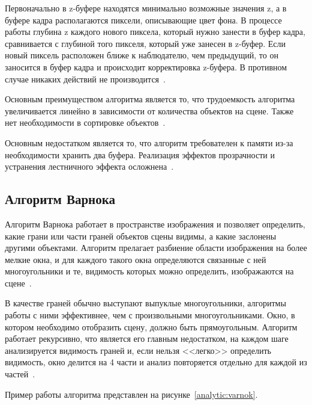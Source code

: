 \documentclass[a4paper, 14pt]{extreport}
\begin{document}
Первоначально в z-буфере находятся минимально возможные значения z, а в буфере кадра располагаются пиксели, 
описывающие цвет фона. В процессе работы глубина z каждого нового пиксела, который нужно занести в буфер кадра, 
сравнивается с глубиной того пикселя, который уже занесен в z-буфер. Если новый пиксель расположен ближе к наблюдателю, 
чем предыдущий, то он заносится в буфер кадра и происходит корректировка z-буфера. В противном случае никаких действий 
не производится~\cite{gonhchan}.

Основным преимуществом алгоритма является то, что трудоемкость алгоритма увеличивается линейно в зависимости от 
количества объектов на сцене. Также нет необходимости в сортировке объектов~\cite{polsky}.

Основным недостатком является то, что алгоритм требователен к памяти из-за необходимости хранить два буфера.
Реализация эффектов прозрачности и устранения лестничного эффекта осложнена~\cite{polsky}.

\subsection{Алгоритм Варнока}

Алгоритм Варнока работает в пространстве изображения и позволяет определить, какие грани или части граней объектов сцены 
видимы, а какие заслонены другими объектами. Алгоритм прелагает разбиение области изображения на более мелкие окна, и 
для каждого такого окна определяются связанные с ней многоугольники и те, видимость которых можно определить, 
изображаются на сцене~\cite{porev}.

В качестве граней обычно выступают выпуклые многоугольники, алгоритмы работы с ними эффективнее, чем с произвольными 
многоугольниками. Окно, в котором необходимо отобразить сцену, должно быть прямоугольным. Алгоритм работает 
рекурсивно, что является его главным недостатком, на каждом шаге анализируется видимость граней и, если  нельзя <<легко>> 
определить видимость, окно делится на 4 части и анализ повторяется отдельно для каждой из частей~\cite{rodjers}.

Пример работы алгоритма представлен на рисунке~\ref{analytic:varnok}.
\end{document}
